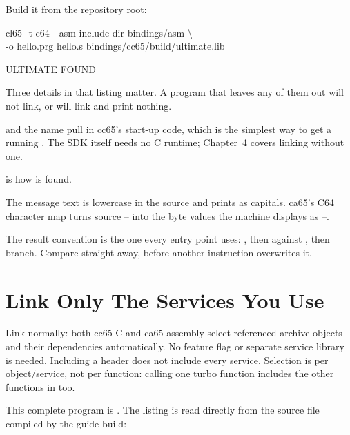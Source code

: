 Build it from the repository root:

\begin{listingbox}
cl65 -t c64 -{}-asm-include-dir bindings/asm \textbackslash\\
\hspace*{2em}-o hello.prg hello.s bindings/cc65/build/ultimate.lib
\end{listingbox}

\begin{outputbox}
ULTIMATE FOUND
\end{outputbox}

Three details in that listing matter. A program that leaves any of them out
will not link, or will link and print nothing.

 and the name  pull in cc65's
start-up code, which is the simplest way to get a running . The SDK
itself needs no C runtime; Chapter~4 covers linking without one.


 is how  is found.

The message text is lowercase in the source and prints as capitals. ca65's C64
character map turns source -- into the byte values the machine
displays as --.

The result convention is the one every entry point uses: , then
 against , then branch. Compare  straight
away, before another instruction overwrites it.


\section{Link Only The Services You Use}
\label{sec:selective-linking}

Link  normally: both cc65 C and ca65 assembly select
referenced archive objects and their dependencies automatically. No feature
flag or separate service library is needed. Including a header does not
include every service. Selection is per object/service, not per function:
calling one turbo function includes the other functions in  too.

This complete program is . The listing is
read directly from the source file compiled by the guide build:

